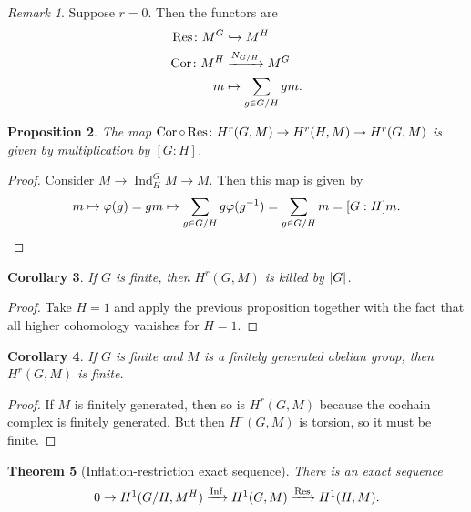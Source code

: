 \documentclass[leqno, openany]{memoir}
\newtheorem{thm}{Theorem}[section]
\newtheorem{cor}[thm]{Corollary}
\newtheorem{prop}[thm]{Proposition}
\theoremstyle{definition}
\theoremstyle{remark}
\newtheorem{rmk}[thm]{Remark}
\theoremstyle{plain}
\theoremstyle{definition}
\theoremstyle{remark}
\DeclareMathOperator{\Ind}{Ind}
\DeclareMathOperator{\Inf}{Inf}
\DeclareMathOperator{\Cor}{Cor}
\begin{document}
\begin{rmk}
    Suppose $r = 0$. Then the functors are
    \begin{align*}
        \Res \colon M^G &\hookrightarrow M^H \\
        \Cor \colon M^H &\xrightarrow{N_{G/H}} M^G \\
                      m &\mapsto \sum_{g \in G/H} gm.
    \end{align*}
\end{rmk}

\begin{prop}
    The map $\Cor \circ \Res \colon H^r(G, M) \to H^r(H, M) \to H^r(G, M)$ is given by multiplication by $[G:H]$.
\end{prop}

\begin{proof}
    Consider $M \to \Ind_H^G M \to M$. Then this map is given by
    \[ m \mapsto \varphi(g) = gm \mapsto \sum_{g \in G/H} g \varphi(g^{-1}) = \sum_{g \in G/H} m = [G:H]m. \qedhere \]
\end{proof}

\begin{cor}
    If $G$ is finite, then $H^r(G, M)$ is killed by $\abs{G}$.
\end{cor}

\begin{proof}
    Take $H = 1$ and apply the previous proposition together with the fact that all higher cohomology vanishes for $H = 1$.
\end{proof}

\begin{cor}
    If $G$ is finite and $M$ is a finitely generated abelian group, then $H^r(G, M)$ is finite.
\end{cor}

\begin{proof}
    If $M$ is finitely generated, then so is $H^r(G, M)$ because the cochain complex is finitely generated. But then $H^r(G, M)$ is torsion, so it must be finite.
\end{proof}

\begin{thm}[Inflation-restriction exact sequence]
    There is an exact sequence
    \[ 0 \to H^1(G/H, M^H) \xrightarrow{\Inf} H^1(G, M) \xrightarrow{\Res} H^1(H, M). \]
\end{thm}
\end{document}
